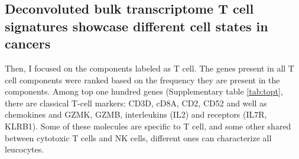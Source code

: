 \documentclass[12pt,]{book}
\theoremstyle{definition}
\theoremstyle{definition}
\theoremstyle{definition}
\theoremstyle{remark}
\begin{document}
\hypertarget{deconvoluted-bulk-transcriptome-t-cell-signatures-showcase-different-cell-states-in-cancers}{%
\subsection{Deconvoluted bulk transcriptome T cell signatures showcase
different cell states in
cancers}\label{deconvoluted-bulk-transcriptome-t-cell-signatures-showcase-different-cell-states-in-cancers}}

Then, I focused on the components labeled as T cell. The genes present
in all T cell components were ranked based on the frequency they are
present in the components. Among top one hundred genes (Supplementary
table \ref{tab:topt}, there are classical T-cell markers: CD3D, cD8A,
CD2, CD52 and well as chemokines and GZMK, GZMB, interleukins (IL2) and
receptors (IL7R, KLRB1). Some of these molecules are specific to T cell,
and some other shared between cytotoxic T cells and NK cells, different
ones can characterize all leucocytes.
\end{document}
